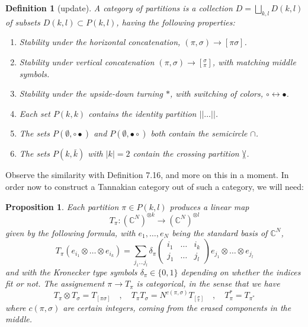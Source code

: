 \documentclass[12pt]{amsbook}
\newtheorem{definition}[theorem]{Definition}
\newtheorem{proposition}[theorem]{Proposition}
\begin{document}
\begin{definition}[update]
A category of partitions is a collection $D=\bigsqcup_{k,l}D(k,l)$ of subsets $D(k,l)\subset P(k,l)$, having the following properties:
\begin{enumerate}
\item Stability under the horizontal concatenation, $(\pi,\sigma)\to[\pi\sigma]$.

\item Stability under vertical concatenation $(\pi,\sigma)\to[^\sigma_\pi]$, with matching middle symbols.

\item Stability under the upside-down turning $*$, with switching of colors, $\circ\leftrightarrow\bullet$.

\item Each set $P(k,k)$ contains the identity partition $||\ldots||$.

\item The sets $P(\emptyset,\circ\bullet)$ and $P(\emptyset,\bullet\circ)$ both contain the semicircle $\cap$.

\item The sets $P(k,\bar{k})$ with $|k|=2$ contain the crossing partition $\slash\hskip-2.0mm\backslash$.
\end{enumerate}
\end{definition} 

Observe the similarity with Definition 7.16, and more on this in a moment. In order now to construct a Tannakian category out of such a category, we will need:

\begin{proposition}
Each partition $\pi\in P(k,l)$ produces a linear map
$$T_\pi:(\mathbb C^N)^{\otimes k}\to(\mathbb C^N)^{\otimes l}$$
given by the following formula, with $e_1,\ldots,e_N$ being the standard basis of $\mathbb C^N$,
$$T_\pi(e_{i_1}\otimes\ldots\otimes e_{i_k})=\sum_{j_1\ldots j_l}\delta_\pi\begin{pmatrix}i_1&\ldots&i_k\\ j_1&\ldots&j_l\end{pmatrix}e_{j_1}\otimes\ldots\otimes e_{j_l}$$
and with the Kronecker type symbols $\delta_\pi\in\{0,1\}$ depending on whether the indices fit or not. The assignement $\pi\to T_\pi$ is categorical, in the sense that we have
$$T_\pi\otimes T_\sigma=T_{[\pi\sigma]}\quad,\quad 
T_\pi T_\sigma=N^{c(\pi,\sigma)}T_{[^\sigma_\pi]}\quad,\quad 
T_\pi^*=T_{\pi^*}$$
where $c(\pi,\sigma)$ are certain integers, coming from the erased components in the middle.
\end{proposition}
\end{document}
